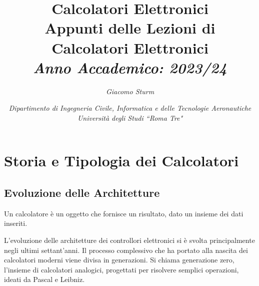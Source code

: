 \documentclass{article}
\numberwithin{equation}{subsection}
\begin{document}
\title{%
    \textbf{Calcolatori Elettronici}  \\ 
    \large Appunti delle Lezioni di Calcolatori Elettronici \\
    \textit{Anno Accademico: 2023/24}}
\author{\textit{Giacomo Sturm}}
\date{\textit{Dipartimento di Ingegneria Civile, Informatica e delle Tecnologie Aeronautiche \\
Università degli Studi ``Roma Tre"}}

\maketitle
\thispagestyle{link}

\clearpage


\pagestyle{fancy}
\fancyhead{}\fancyfoot{}
\fancyfoot[C]{\thepage}

\tableofcontents

\clearpage
{}





\section{Storia e Tipologia dei Calcolatori}


\subsection{Evoluzione delle Architetture}



Un calcolatore è un oggetto che fornisce un risultato, dato un insieme dei dati inseriti. 


L'evoluzione delle architetture dei controllori elettronici si è svolta principalmente negli ultimi settant'anni. Il processo complessivo che ha portato alla nascita 
dei calcolatori moderni viene divisa in generazioni. 
Si chiama generazione zero, l'insieme di calcolatori analogici, progettati per risolvere semplici operazioni, ideati da Pascal e Leibniz. 
\end{document}
